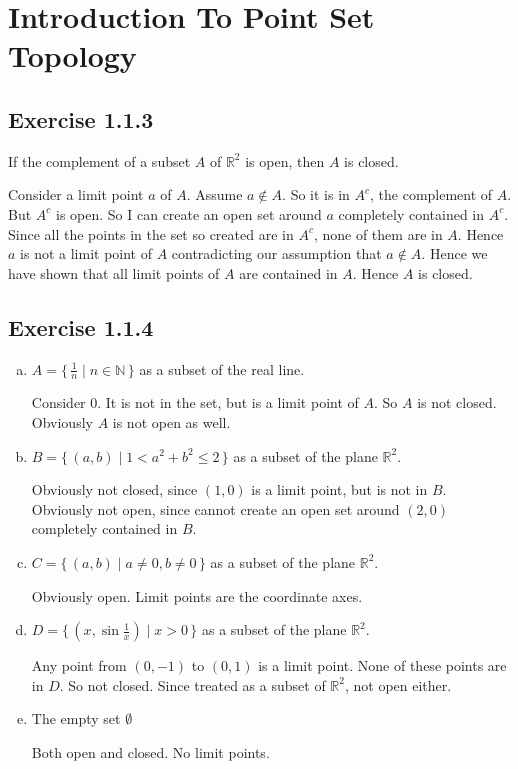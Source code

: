 \section*{Introduction To Point Set Topology}
\subsection*{Exercise 1.1.3}
If the complement of a subset $A$ of $\mathbb{R}^2$ is open, 
then $A$ is closed.

Consider a limit point $a$ of $A$. Assume $a \notin A$. So it is in
$A^c$, the complement of $A$. But $A^c$ is open. So I can create an open
set around $a$ completely contained in $A^c$. Since all the points in the
set so created are in $A^c$, none of them are in $A$. Hence $a$ is not a
limit point of $A$ contradicting our assumption that $a \notin A$. Hence
we have shown that all limit points of $A$ are contained in $A$. Hence
$A$ is closed.

\subsection*{Exercise 1.1.4}
\begin{enumerate}[(a)]
\item $A = \{\, \frac{1}{n} \mid n \in \mathbb{N} \,\}$
as a subset of the real line.

Consider $0$. It is not in the set, but is a limit point of $A$. So $A$
is not closed. Obviously $A$ is not open as well.

\item $B = \{\, (a,b) \mid 1 < a^2 + b^2 \le 2 \,\}$
as a subset of the plane $\mathbb{R}^2$.

Obviously not closed, since $(1,0)$ is a limit point, but is not in $B$.
Obviously not open, since cannot create an open set around $(2,0)$
completely contained in $B$.

\item $C = \{\, (a,b) \mid a \neq 0, b \neq 0 \,\}$
as a subset of the plane $\mathbb{R}^2$.

Obviously open. Limit points are the coordinate axes.

\item $D = \{\, (x, \sin{\frac{1}{x}}) \mid x > 0 \,\}$
as a subset of the plane $\mathbb{R}^2$.

Any point from $(0, -1)$ to $(0, 1)$ is a limit point. None of these
points are in $D$. So not closed. Since treated as a subset of 
$\mathbb{R}^2$, not open either.

\item The empty set $\emptyset$

Both open and closed. No limit points.
\end{enumerate}

